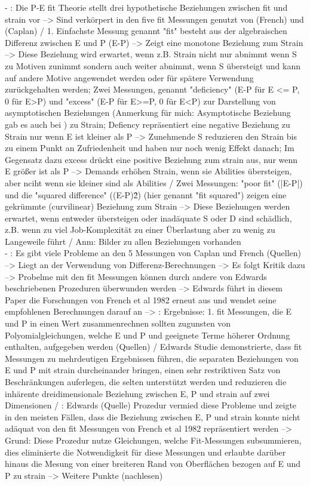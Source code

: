 - \cite[S. 2]{edwards:1993}: Die P-E fit Theorie stellt drei hypothetische Beziehungen zwischen fit und strain vor --> Sind verkörpert in den five fit Messungen genutzt von (French) und (Caplan) / 1. Einfachste Messung genannt "fit" besteht aus der algebraischen Differenz zwischen E und P (E-P) --> Zeigt eine monotone Beziehung zum Strain --> Diese Beziehung wird erwartet, wenn z.B. Strain nicht nur abnimmt wenn S zu Motiven zunimmt sondern auch weiter abnimmt, wenn S übersteigt und kann auf andere Motive angewendet werden oder für spätere Verwendung zurückgehalten werden; Zwei Messungen, genannt "deficiency" (E-P für E <= P, 0 für E>P) und "excess" (E-P für E>=P, 0 für E<P) zur Darstellung von asymptotischen Beziehungen (Anmerkung für mich: Asymptotische Beziehung gab es auch bei \cite{edwards:1996}) zu Strain; Defiency repräsentiert eine negative Beziehung zu Strain nur wenn E ist kleiner als P --> Zunehmende S reduzieren den Strain bis zu einem Punkt an Zufriedenheit und haben nur noch wenig Effekt danach; Im Gegensatz dazu excess drückt eine positive Beziehung zum strain aus, nur wenn E größer ist als P --> Demands erhöhen Strain, wenn sie Abilities übersteigen, aber nciht wenn sie kleiner sind als Abilities / Zwei Messungen: "poor fit" (|E-P|) und die "squared difference" ((E-P)\^2) (hier genannt "fit squared") zeigen eine gekrümmte (curvilinear) Beziehung zum Strain --> Diese Beziehungen werden erwartet, wenn entweder übersteigen oder inadäquate S oder D sind schädlich, z.B. wenn zu viel Job-Komplexität zu einer Überlastung aber zu wenig zu Langeweile führt / Anm: Bilder zu allen Beziehungen vorhanden \\
- \cite[S. 2]{edwards:1993}: Es gibt viele Probleme an den 5 Messungen von Caplan und French (Quellen) --> Liegt an der Verwendung von Differenz-Berechnungen --> Es folgt Kritik dazu --> Probelme mit den fit Messungen können durch andere von Edwards beschriebenen Prozeduren überwunden werden --> Edwards führt in diesem Paper die Forschungen von French et al 1982 erneut aus und wendet seine empfohlenen Berechnungen darauf an --> \cite[S. 19]{edwards:1993}: Ergebnisse: 1. fit Messungen, die E und P in einen Wert zusammenrechnen sollten zugunsten von Polyomialgleichungen, welche E und P und geeignete Terme höherer Ordnung enthalten, aufgegeben werden (Quellen) / Edwards Studie demonstrierte, dass fit Messungen zu mehrdeutigen Ergebnissen führen, die separaten Beziehungen von E und P mit strain durcheinander bringen, einen sehr restriktiven Satz von Beschränkungen auferlegen, die selten unterstützt werden und reduzieren die inhärente dreidimensionale Beziehung zwischen E, P und strain auf zwei Dimensionen / \cite[S. 20]{edwards:1993}: Edwards (Quelle) Prozedur vermied diese Probleme und zeigte in den meisten Fällen, dass die Beziehung zwischen E, P und strain konnte nicht adäquat von den fit Messungen von French et al 1982 repräsentiert werden --> Grund: Diese Prozedur nutze Gleichungen, welche Fit-Messungen subsummieren, dies eliminierte die Notwendigkeit für diese Messungen und erlaubte darüber hinaus die Mesung von einer breiteren Rand von Oberflächen bezogen auf E und P zu strain --> Weitere Punkte (nachlesen) \\
